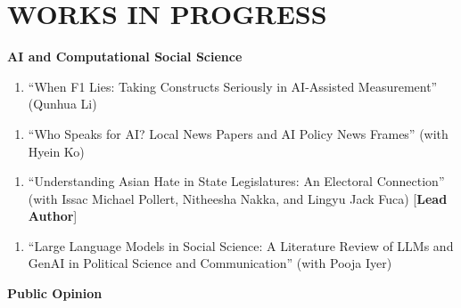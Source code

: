 \documentclass[10.5pt,]{article}
\providecommand{\tightlist}{%
	\setlength{\itemsep}{0pt}\setlength{\parskip}{0pt}}
\renewenvironment{itemize}{
	\begin{list}{}{
			\setlength{\leftmargin}{1.5em}
		}
	}{
	\end{list}
}
\begin{document}
\section{WORKS IN PROGRESS}\label{works-in-progress}

\begin{itemize}
\tightlist
\item
  \textbf{AI and Computational Social Science}

  \begin{itemize}
  \tightlist
  \item
    \begin{enumerate}
    \def\labelenumi{\arabic{enumi}.}
    \setcounter{enumi}{5}
    \tightlist
    \item
      ``When F1 Lies: Taking Constructs Seriously in AI-Assisted
      Measurement'' (Qunhua Li)
    \end{enumerate}
  \item
    \begin{enumerate}
    \def\labelenumi{\arabic{enumi}.}
    \setcounter{enumi}{4}
    \tightlist
    \item
      ``Who Speaks for AI? Local News Papers and AI Policy News Frames''
      (with Hyein Ko)
    \end{enumerate}
  \item
    \begin{enumerate}
    \def\labelenumi{\arabic{enumi}.}
    \setcounter{enumi}{3}
    \tightlist
    \item
      ``Understanding Asian Hate in State Legislatures: An Electoral
      Connection'' (with Issac Michael Pollert, Nitheesha Nakka, and
      Lingyu Jack Fuca) {[}\textbf{Lead Author}{]}
    \end{enumerate}
  \item
    \begin{enumerate}
    \def\labelenumi{\arabic{enumi}.}
    \setcounter{enumi}{2}
    \tightlist
    \item
      ``Large Language Models in Social Science: A Literature Review of
      LLMs and GenAI in Political Science and Communication'' (with
      Pooja Iyer)
    \end{enumerate}
  \end{itemize}
\item
  \textbf{Public Opinion}


\end{itemize}
\end{document}
